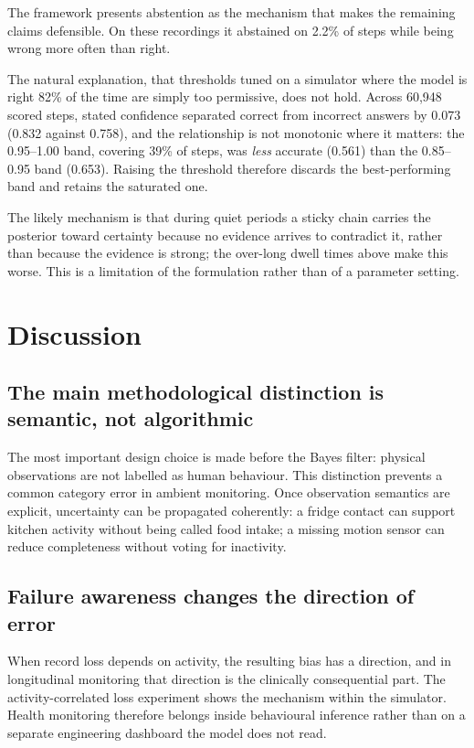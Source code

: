 \documentclass[11pt]{article}
\begin{document}
The framework presents abstention as the mechanism that makes the remaining
claims defensible. On these recordings it abstained on 2.2\% of steps while
being wrong more often than right.

The natural explanation, that thresholds tuned on a simulator where the model is
right 82\% of the time are simply too permissive, does not hold. Across 60{,}948
scored steps, stated confidence separated correct from incorrect answers by
$0.073$ (0.832 against 0.758), and the relationship is not monotonic where it
matters: the 0.95--1.00 band, covering 39\% of steps, was \emph{less} accurate
(0.561) than the 0.85--0.95 band (0.653). Raising the threshold therefore
discards the best-performing band and retains the saturated one.

The likely mechanism is that during quiet periods a sticky chain carries the
posterior toward certainty because no evidence arrives to contradict it, rather
than because the evidence is strong; the over-long dwell times above make this
worse. This is a limitation of the formulation rather than of a parameter
setting.

\section{Discussion}

\subsection{The main methodological distinction is semantic, not algorithmic}

The most important design choice is made before the Bayes filter: physical observations are not labelled as human behaviour. This distinction prevents a common category error in ambient monitoring. Once observation semantics are explicit, uncertainty can be propagated coherently: a fridge contact can support kitchen activity without being called food intake; a missing motion sensor can reduce completeness without voting for inactivity.

\subsection{Failure awareness changes the direction of error}

When record loss depends on activity, the resulting bias has a direction, and in longitudinal monitoring that direction is the clinically consequential part. The activity-correlated loss experiment shows the mechanism within the simulator. Health monitoring therefore belongs inside behavioural inference rather than on a separate engineering dashboard the model does not read.
\end{document}

